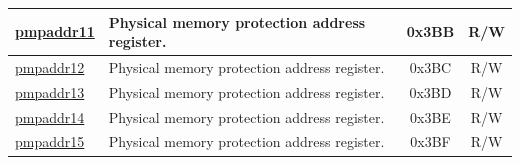 \begin{longtable}{ | p{4.0cm} | p{8.4cm} | c | c| }
\hyperref[sec:riscvcpu-pmp-reg-desc]{pmpaddr11} & Physical memory protection address register. & 0x3BB & R/W \\\hline
\hyperref[sec:riscvcpu-pmp-reg-desc]{pmpaddr12} & Physical memory protection address register. & 0x3BC & R/W \\\hline
\hyperref[sec:riscvcpu-pmp-reg-desc]{pmpaddr13} & Physical memory protection address register. & 0x3BD & R/W \\\hline
\hyperref[sec:riscvcpu-pmp-reg-desc]{pmpaddr14} & Physical memory protection address register. & 0x3BE & R/W \\\hline
\hyperref[sec:riscvcpu-pmp-reg-desc]{pmpaddr15} & Physical memory protection address register. & 0x3BF & R/W \\\hline

\end{longtable}
